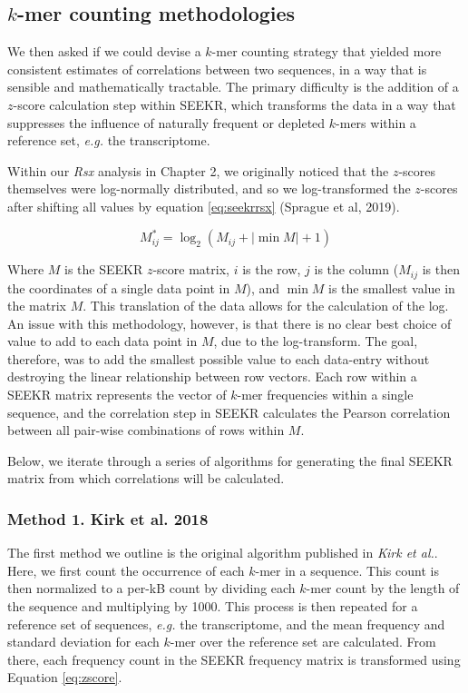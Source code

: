\subsection{$k$-mer counting methodologies}

We then asked if we could devise a $k$-mer counting strategy that yielded more consistent estimates of correlations between two sequences, in a way that is sensible and mathematically tractable. The primary difficulty is the addition of a $z$-score calculation step within SEEKR, which transforms the data in a way that suppresses the influence of naturally frequent or depleted $k$-mers within a reference set, \emph{e.g.} the transcriptome. 

Within our \emph{Rsx} analysis in Chapter 2, we originally noticed that the $z$-scores themselves were log-normally distributed, and so we log-transformed the $z$-scores after shifting all values by equation \ref{eq:seekrrsx} (Sprague et al, 2019).

\begin{equation}
M_{ij}^* = \log_2{\left(M_{ij} + |\min{M}|+1\right)}
\label{eq:seekrrsx}
\end{equation}


Where $M$ is the SEEKR $z$-score matrix, $i$ is the row, $j$ is the column ($M_{ij}$ is then the coordinates of a single data point in $M$), and $\min{M}$ is the smallest value in the matrix $M$. This translation of the data allows for the calculation of the log. An issue with this methodology, however, is that there is no clear best choice of value to add to each data point in $M$, due to the log-transform. The goal, therefore, was to add the smallest possible value to each data-entry without destroying the linear relationship between row vectors. Each row within a SEEKR matrix represents the vector of $k$-mer frequencies within a single sequence, and the correlation step in SEEKR calculates the Pearson correlation between all pair-wise combinations of rows within $M$.

Below, we iterate through a series of algorithms for generating the final SEEKR matrix from which correlations will be calculated. 

\subsubsection{Method 1. Kirk et al. 2018}

The first method we outline is the original algorithm published in \emph{Kirk et al.}. Here, we first count the occurrence of each $k$-mer in a sequence. This count is then normalized to a per-kB count by dividing each $k$-mer count by the length of the sequence and multiplying by 1000. This process is then repeated for a reference set of sequences, \emph{e.g.} the transcriptome, and the mean frequency and standard deviation for each $k$-mer over the reference set are calculated. From there, each frequency count in the SEEKR frequency matrix is transformed using Equation \ref{eq:zscore}. 

